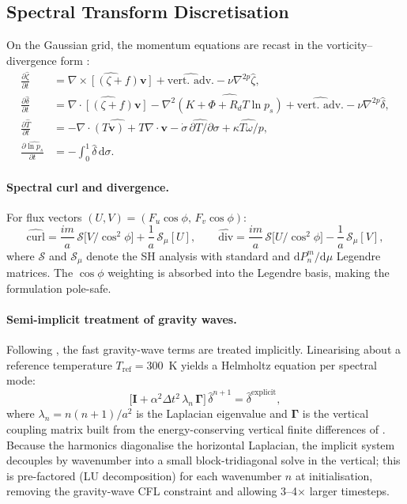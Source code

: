 \documentclass[11pt,twoside]{report}
\newcommand{\dd}{\mathrm{d}}
\newcommand{\pp}{\partial}
\newcommand{\Rd}{R_d}
\newcommand{\vect}[1]{\bm{#1}}
\newcommand{\divg}{\nabla\!\cdot\!}
\newcommand{\curl}{\nabla\!\times\!}
\begin{document}
\subsection{Spectral Transform Discretisation}
\label{sec:spe}

On the Gaussian grid, the momentum equations are recast in the
vorticity--divergence form \citep{Bourke1972}:
\begin{align}
  \frac{\pp\hat\zeta}{\pp t} &=
  \widehat{\curl[(\zeta+f)\vect{v}]}
  + \widehat{\text{vert.\ adv.}} - \nu\nabla^{2p}\hat\zeta,
  \label{eq:spe-vor}\\
  \frac{\pp\hat\delta}{\pp t} &=
  \widehat{\divg[(\zeta+f)\vect{v}]}
  - \nabla^2\widehat{(K+\Phi+\Rd T\ln p_s)}
  + \widehat{\text{vert.\ adv.}} - \nu\nabla^{2p}\hat\delta,
  \label{eq:spe-div}\\
  \frac{\pp\hat T}{\pp t} &=
  \widehat{-\divg(T\vect{v})+T\divg\vect{v}}
  - \widehat{\dot\sigma\,\pp T/\pp\sigma}
  + \widehat{\kappa T\omega/p},
  \label{eq:spe-T}\\
  \frac{\pp\widehat{\ln p_s}}{\pp t} &= -\int_0^1\hat\delta\,\dd\sigma.
  \label{eq:spe-lnps}
\end{align}

\paragraph{Spectral curl and divergence.}
For flux vectors $(U,V)=(F_u\cos\phi,\,F_v\cos\phi)$:
\begin{equation}
  \widehat{\text{curl}} = \frac{im}{a}\,\mathcal{S}\bigl[V/\cos^2\!\phi\bigr]
  + \frac{1}{a}\,\mathcal{S}_\mu[U],
  \qquad
  \widehat{\text{div}} = \frac{im}{a}\,\mathcal{S}\bigl[U/\cos^2\!\phi\bigr]
  - \frac{1}{a}\,\mathcal{S}_\mu[V],
\end{equation}
where $\mathcal{S}$ and $\mathcal{S}_\mu$ denote the SH analysis with
standard and $\dd P_n^m/\dd\mu$ Legendre matrices.  The $\cos\phi$ weighting
is absorbed into the Legendre basis, making the formulation pole-safe.

\paragraph{Semi-implicit treatment of gravity waves.}
Following \citet{HoskinsSimmons1975}, the fast gravity-wave terms are
treated implicitly.  Linearising about a reference temperature $T_{\mathrm{ref}}=300$~K
yields a Helmholtz equation per spectral mode:
\begin{equation}
  \bigl[\mathbf{I} + \alpha^2\Delta t^2\,\lambda_n\,\mathbf{\Gamma}\bigr]\,
  \hat\delta^{n+1} = \hat\delta^{\mathrm{explicit}},
\end{equation}
where $\lambda_n = n(n+1)/a^2$ is the Laplacian eigenvalue and $\mathbf{\Gamma}$
is the vertical coupling matrix built from the energy-conserving vertical
finite differences of \citet{SimmonsBurridge1981}. Because the harmonics
diagonalise the horizontal Laplacian, the implicit system decouples by
wavenumber into a small block-tridiagonal solve in the vertical; this is
pre-factored (LU decomposition) for each wavenumber $n$ at initialisation,
removing the gravity-wave CFL constraint and allowing 3--4$\times$ larger
timesteps.
\end{document}
